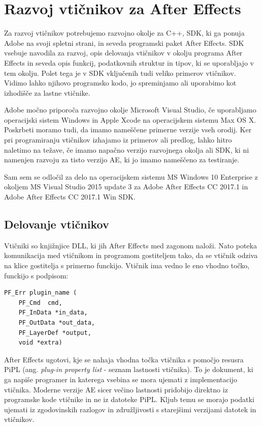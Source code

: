 \documentclass[a4paper, 12pt]{book}
\begin{document}
\chapter{Razvoj vtičnikov za After Effects}

Za razvoj vtičnikov potrebujemo razvojno okolje za C++, SDK, ki ga ponuja Adobe na svoji spletni strani, in seveda programski paket After Effects. 
SDK vsebuje navodila za razvoj, opis delovanja vtičnikov v okolju programa After Effects in seveda opis funkcij, podatkovnih struktur in tipov, ki se uporabljajo v tem okolju. 
Polet tega je v SDK vključenih tudi veliko primerov vtičnikov. 
Vidimo lahko njihovo programsko kodo, jo spreminjamo ali uporabimo kot izhodišče za lastne vtičnike.

Adobe močno priporoča razvojno okolje Microsoft Visual Studio, če uporabljamo operacijski sistem Windows in Apple Xcode na operacijskem sistemu Max OS X. 
Poskrbeti moramo tudi, da imamo nameščene primerne verzije vseh orodij. 
Ker pri programiranju vtičnikov izhajamo iz primerov ali predlog, lahko hitro naletimo na težave, če imamo napačno verzijo razvojnega okolja ali SDK, ki ni namenjen razvoju za tisto verzijo AE, ki jo imamo nameščeno za testiranje.

Sam sem se odločil za delo na operacijskem sistemu MS Windows 10 Enterprise z okoljem MS Visual Studio 2015 update 3 za Adobe After Effects CC 2017.1 in Adobe After Effects CC 2017.1 Win SDK. 


\section{Delovanje vtičnikov}
Vtičniki so knjižnjice DLL, ki jih After Effects med zagonom naloži. 
Nato poteka komunikacija med vtičnikom in programom gostiteljem tako, da se vtičnik odziva na klice gostitelja s primerno funckijo. 
Vtičnik ima vedno le eno vhodno točko, funckijo s podpisom:
\begin{verbatim}
PF_Err plugin_name (
    PF_Cmd	cmd,
    PF_InData *in_data,
    PF_OutData *out_data,
    PF_LayerDef *output,
    void *extra)
\end{verbatim}

After Effects ugotovi, kje se nahaja vhodna točka vtičnika s pomočjo resusra PiPL (ang. {\it plug-in property list} - seznam lastnosti vtičnika).
To je dokument, ki ga napiše programer in katerega vsebina se mora ujemati z implementacijo vtičnika. 
Moderne verzije AE sicer večino lastnosti pridobijo direktno iz programske kode vtičnike in ne iz datoteke PiPL. 
Kljub temu se morajo podatki ujemati iz zgodovinskih razlogov in združljivosti s starejšimi verzijami datotek in vtičnikov. 
\end{document}
